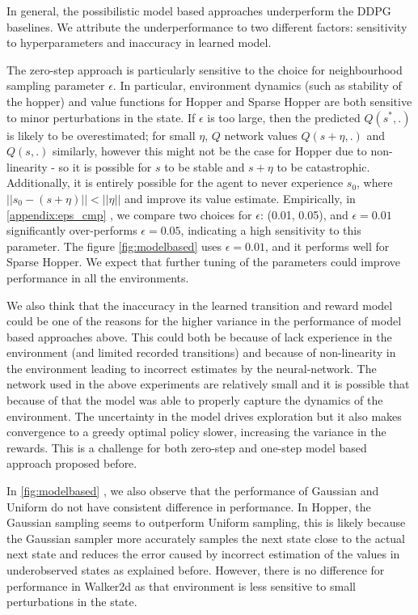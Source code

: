 \documentclass[11pt,a4paper]{report}
\begin{document}
\par

In general, the possibilistic model based approaches underperform the DDPG baselines. We attribute the underperformance to two different factors: sensitivity to hyperparameters and inaccuracy in learned model. 

The zero-step approach is particularly sensitive to the choice for neighbourhood sampling parameter $\epsilon$. In particular, environment dynamics (such as stability of the hopper) and value functions for Hopper and Sparse Hopper are both sensitive to minor perturbations in the state. If $\epsilon$ is too large, then the predicted $Q(s^*, .)$ is likely to be overestimated; for small $\eta$, $Q$ network values $Q(s + \eta, .)$ and $Q(s, .)$ similarly, however this might not be the case for Hopper due to non-linearity - so it is possible for $s$ to be stable and $s + \eta$ to be catastrophic. Additionally, it is entirely possible for the agent to never experience $s_0$, where $||s_0 - (s+\eta)|| < ||\eta||$ and improve its value estimate. Empirically, in \ref{appendix:eps_cmp} , we compare two choices for $\epsilon$: (0.01, 0.05), and $\epsilon = 0.01$ significantly over-performs $\epsilon = 0.05$, indicating a high sensitivity to this parameter. The figure \ref{fig:modelbased} uses $\epsilon = 0.01$, and it performs well for Sparse Hopper. We expect that further tuning of the parameters could improve performance in all the environments. \par

We also think that the inaccuracy in the learned transition and reward model could be one of the reasons for the higher variance in the performance of model based approaches above. This could both be because of lack experience in the environment (and limited recorded transitions) and because of non-linearity in the environment leading to incorrect estimates by the neural-network. The network used in the above experiments are relatively small and it is possible that because of that the model was able to properly capture the dynamics of the environment. The uncertainty in the model drives exploration but it also makes convergence to a greedy optimal policy slower, increasing the variance in the rewards. This is a challenge for both zero-step and one-step model based approach proposed before. 
\par 
In \ref{fig:modelbased} , we also observe that the performance of Gaussian and Uniform do not have consistent difference in performance. In Hopper, the Gaussian sampling seems to outperform Uniform sampling, this is likely because the Gaussian sampler more accurately samples the next state close to the actual next state and reduces the error caused by incorrect estimation of the values in underobserved states as explained before. However, there is no difference for performance in Walker2d as that environment is less sensitive to small perturbations in the state. 
\end{document}
